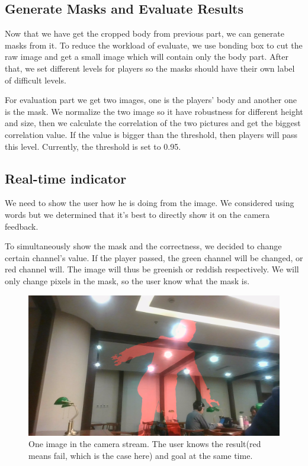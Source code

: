\documentclass[conference,compsoc]{IEEEtran}
\begin{document}
	\subsection{Generate Masks and Evaluate Results}
		Now that we have get the cropped body from previous part, we can generate masks from it. 
		To reduce the workload of evaluate, we use bonding box to cut the raw image and get a small image which will contain only the body part.
		After that, we set different levels for players so the masks should have their own label of difficult levels.
	\par
		For evaluation part we get two images, one is the players' body and another one is the mask. 
		We normalize the two image so it have robustness for different height and size, then we calculate the correlation of the two pictures and get the biggest correlation value. 
		If the value is bigger than the threshold, then players will pass this level.
		Currently, the threshold is set to 0.95.
	\subsection{Real-time indicator}
	\par
		We need to show the user how he is doing from the image. We considered using words but we determined that it's best to directly show it on the camera feedback.
	\par
		To simultaneously show the mask and the correctness, we decided to change certain channel's value.
		If the player passed, the green channel will be changed, or red channel will. The image will thus be greenish or reddish respectively.
		We will only change pixels in the mask, so the user know what the mask is.
		\begin{figure}[h]
			\centering
			\includegraphics[width=\linewidth]{./Pic/Level}
			\caption{One image in the camera stream. The user knows the result(red means fail, which is the case here) and goal at the same time.}
		\end{figure}	
\end{document}
